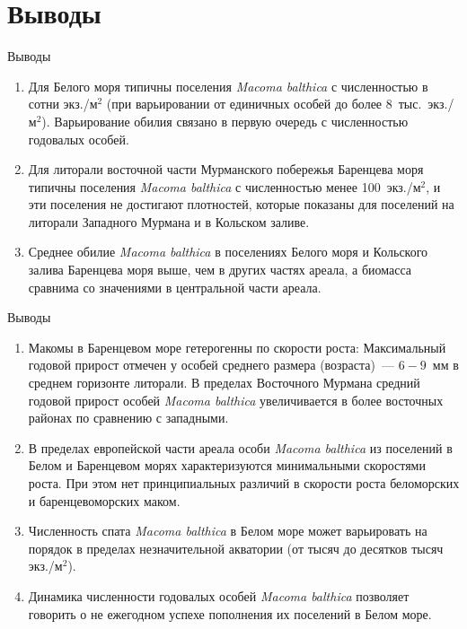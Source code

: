 \documentclass{beamer}
\begin{document}
		\section{Выводы}
\begin{small}

\begin{frame}{Выводы}
\addtocounter{enumi}{0}
	\begin{enumerate}
		\item Для Белого моря типичны поселения {\it Macoma balthica} с численностью в сотни экз./м$^2$ (при варьировании от единичных особей до более $8$~тыс.~экз./м$^2$). Варьирование обилия связано в первую очередь с численностью годовалых особей.
		      \pause
		\item Для литорали восточной части Мурманского побережья Баренцева моря типичны поселения {\it Macoma balthica} с численностью  менее 100~экз./м$^2$, и эти поселения не достигают плотностей, которые показаны для поселений на литорали Западного Мурмана и в Кольском заливе.
		      \pause
		\item Среднее обилие {\it Macoma balthica} в поселениях Белого моря и Кольского залива Баренцева моря выше, чем в других частях ареала, а биомасса сравнима со значениями в центральной части ареала. 
	\end{enumerate}
\end{frame}


\begin{frame}{Выводы}
	\begin{enumerate}
\addtocounter{enumi}{3}
		\item Макомы в Баренцевом море гетерогенны по скорости роста: Максимальный годовой прирост отмечен у особей среднего размера (возраста)~--- $6 - 9$~мм в среднем горизонте литорали. В пределах Восточного Мурмана средний годовой прирост особей {\it Macoma balthica} увеличивается в более восточных районах по сравнению с западными.
		      \pause
		\item В пределах европейской части ареала особи {\it Macoma balthica} из поселений в Белом и Баренцевом морях характеризуются минимальными скоростями роста. При этом нет принципиальных различий в скорости роста беломорских и баренцевоморских маком.
		      \pause
		\item Численность спата {\it Macoma balthica} в Белом море может варьировать на порядок в пределах незначительной акватории (от тысяч до десятков тысяч экз./м$^2$).
		      \pause
		\item Динамика численности годовалых особей {\it Macoma balthica} позволяет говорить о не ежегодном успехе пополнения их поселений в Белом море.
	\end{enumerate}
\end{frame}


\end{small}
\end{document}
